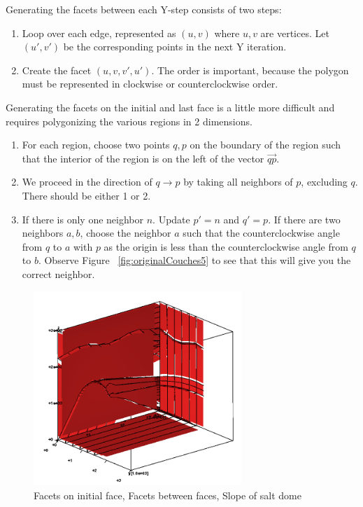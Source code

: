 Generating the facets between each Y-step consists of two steps:
\begin{enumerate}
\item Loop over each edge, represented as $(u,v)$ where $u,v$ are vertices. Let $(u',v')$ be the corresponding points in the next Y iteration.
\item Create the facet $(u, v, v', u')$. The order is important, because the polygon must be represented in clockwise or counterclockwise order.
\end{enumerate}

Generating the facets on the initial and last face is a little more difficult and requires polygonizing the various regions in 2 dimensions. 
\begin{enumerate}
\item For each region, choose two points $q,p$ on the boundary of the region such that the interior of the region is on the left of the vector $\vec{qp}$. 
\item We proceed in the direction of $q \rightarrow p$ by taking all neighbors of $p$, excluding $q$. There should be either 1 or 2.
\item If there is only one neighbor $n$. Update $p'=n$ and $q'=p$. If there are two neighbors $a,b$, choose the neighbor $a$ such that the counterclockwise angle from $q$ to $a$ with $p$ as the origin is less than the counterclockwise angle from $q$ to $b$. Observe Figure ~\ref{fig:originalCouches5} to see that this will give you the correct neighbor.
\end{enumerate}



\begin{figure}[H]
\centering
\includegraphics[width=0.7\textwidth]{Images/Facets.png}
\caption{Facets on initial face, Facets between faces, Slope of salt dome}
\label{fig:facets}
\end{figure}


